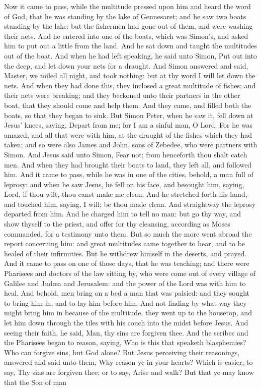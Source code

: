 Now it came to pass, while the multitude pressed upon him and heard the word of God, that he was standing by the lake of Gennesaret; and he saw two boats standing by the lake: but the fishermen had gone out of them, and were washing their nets. And he entered into one of the boats, which was Simon’s, and asked him to put out a little from the land. And he sat down and taught the multitudes out of the boat. And when he had left speaking, he said unto Simon, Put out into the deep, and let down your nets for a draught. And Simon answered and said, Master, we toiled all night, and took nothing: but at thy word I will let down the nets. And when they had done this, they inclosed a great multitude of fishes; and their nets were breaking; and they beckoned unto their partners in the other boat, that they should come and help them. And they came, and filled both the boats, so that they began to sink. But Simon Peter, when he saw it, fell down at Jesus’ knees, saying, Depart from me; for I am a sinful man, O Lord. For he was amazed, and all that were with him, at the draught of the fishes which they had taken; and so were also James and John, sons of Zebedee, who were partners with Simon. And Jesus said unto Simon, Fear not; from henceforth thou shalt catch men. And when they had brought their boats to land, they left all, and followed him.  And it came to pass, while he was in one of the cities, behold, a man full of leprosy: and when he saw Jesus, he fell on his face, and besought him, saying, Lord, if thou wilt, thou canst make me clean. And he stretched forth his hand, and touched him, saying, I will; be thou made clean. And straightway the leprosy departed from him. And he charged him to tell no man: but go thy way, and show thyself to the priest, and offer for thy cleansing, according as Moses commanded, for a testimony unto them. But so much the more went abroad the report concerning him: and great multitudes came together to hear, and to be healed of their infirmities. But he withdrew himself in the deserts, and prayed.  And it came to pass on one of those days, that he was teaching; and there were Pharisees and doctors of the law sitting by, who were come out of every village of Galilee and Judæa and Jerusalem: and the power of the Lord was with him to heal. And behold, men bring on a bed a man that was palsied: and they sought to bring him in, and to lay him before him. And not finding by what way they might bring him in because of the multitude, they went up to the housetop, and let him down through the tiles with his couch into the midst before Jesus. And seeing their faith, he said, Man, thy sins are forgiven thee. And the scribes and the Pharisees began to reason, saying, Who is this that speaketh blasphemies? Who can forgive sins, but God alone? But Jesus perceiving their reasonings, answered and said unto them, Why reason ye in your hearts? Which is easier, to say, Thy sins are forgiven thee; or to say, Arise and walk? But that ye may know that the Son of man 